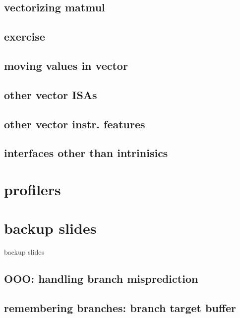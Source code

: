 \subsection{vectorizing matmul}


\subsection{exercise}


\subsection{moving values in vector}


\subsection{other vector ISAs}


\subsection{other vector instr. features}


\subsection{interfaces other than intrinisics}


\section{profilers}



\section{backup slides}
\begin{frame}{backup slides}
\end{frame}

\subsection{OOO: handling branch misprediction}


\subsection{remembering branches: branch target buffer}


